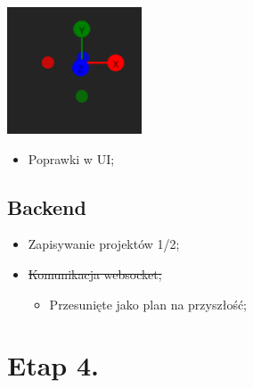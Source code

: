 \documentclass[11pt]{article}
\begin{document}
\begin{center}
\includegraphics[width=.9\linewidth]{./img/gizmo.jpg}
\end{center}
\begin{itemize}
\item Poprawki w UI;
\end{itemize}
\subsection{Backend}
\label{sec:org9cbae4e}
\begin{itemize}
\item Zapisywanie projektów 1/2;
\item \sout{Komunikacja websocket;}
\begin{itemize}
\item Przesunięte jako plan na przyszłość;
\end{itemize}
\end{itemize}
\section{Etap 4.}
\label{sec:org903d9ef}
\end{document}
